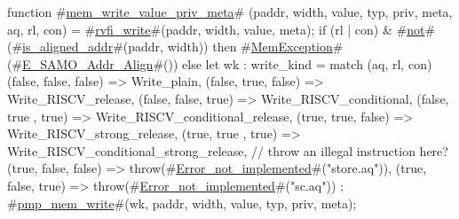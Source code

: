 function #\hyperref[sailRISCVzmemzywritezyvaluezyprivzymeta]{mem\_write\_value\_priv\_meta}# (paddr, width, value, typ, priv, meta, aq, rl, con) = {
  #\hyperref[sailRISCVzrvfizywrite]{rvfi\_write}#(paddr, width, value, meta);
  if (rl | con) & #\hyperref[sailRISCVznot]{not}#(#\hyperref[sailRISCVziszyalignedzyaddr]{is\_aligned\_addr}#(paddr, width))
  then #\hyperref[sailRISCVzMemException]{MemException}#(#\hyperref[sailRISCVzEzySAMOzyAddrzyAlign]{E\_SAMO\_Addr\_Align}#())
  else {
    let wk : write_kind = match (aq, rl, con) {
      (false, false, false) => Write_plain,
      (false, true,  false) => Write_RISCV_release,
      (false, false, true)  => Write_RISCV_conditional,
      (false, true , true)  => Write_RISCV_conditional_release,
      (true,  true,  false) => Write_RISCV_strong_release,
      (true,  true , true)  => Write_RISCV_conditional_strong_release,
      // throw an illegal instruction here?
      (true,  false, false) => throw(#\hyperref[sailRISCVzErrorzynotzyimplemented]{Error\_not\_implemented}#("store.aq")),
      (true,  false, true)  => throw(#\hyperref[sailRISCVzErrorzynotzyimplemented]{Error\_not\_implemented}#("sc.aq"))
    };
    #\hyperref[sailRISCVzpmpzymemzywrite]{pmp\_mem\_write}#(wk, paddr, width, value, typ, priv, meta);
  }
}
